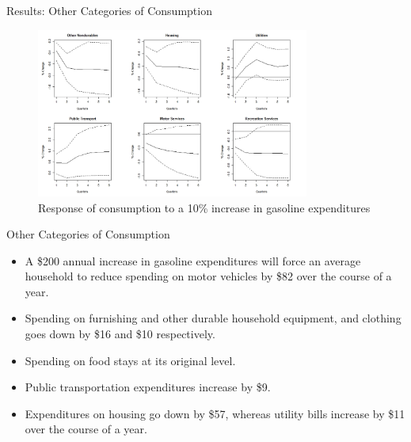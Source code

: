 \documentclass[
  10pt,
  ignorenonframetext,
]{beamer}
\begin{document}
\begin{frame}{Results: Other Categories of Consumption}
\protect\hypertarget{results-other-categories-of-consumption-1}{}

\begin{figure}
\centering
\includegraphics[width=0.8\textwidth,height=\textheight]{Disaggregated - 2.jpeg}
\caption{Response of consumption to a 10\% increase in gasoline
expenditures}
\end{figure}

\end{frame}

\begin{frame}{Other Categories of Consumption}
\protect\hypertarget{other-categories-of-consumption-1}{}

\begin{itemize}
\item
  A \$200 annual increase in gasoline expenditures will force an average
  household to reduce spending on motor vehicles by \$82 over the course
  of a year.
\item
  Spending on furnishing and other durable household equipment, and
  clothing goes down by \$16 and \$10 respectively.
\item
  Spending on food stays at its original level.
\item
  Public transportation expenditures increase by \$9.
\item
  Expenditures on housing go down by \$57, whereas utility bills
  increase by \$11 over the course of a year.
\end{itemize}

\end{frame}
\end{document}
